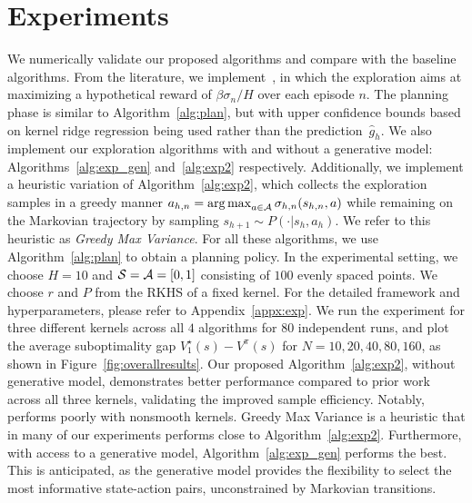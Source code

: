 \section{Experiments}\label{sec:exp}



We numerically validate our proposed algorithms and compare with the baseline algorithms. From the literature, we implement~\cite{qiu2021reward}, in which the exploration aims at maximizing a hypothetical reward of $\beta\sigma_n/H$ over each episode $n$. The planning phase is similar to Algorithm~\ref{alg:plan}, but with upper confidence bounds based on kernel ridge regression being used rather than the prediction~$\hat{g}_h$. 
We also implement our exploration algorithms with and without a generative model: Algorithms~\ref{alg:exp_gen} and~\ref{alg:exp2} respectively. Additionally, we implement a heuristic variation of Algorithm~\ref{alg:exp2}, which collects the exploration samples in a greedy manner $a_{h,n}=\operatorname*{arg\,max}_{a\in\mathcal{A}}\sigma_{h,n}(s_{h,n},a)$ while remaining on the Markovian trajectory by sampling $s_{h+1}\sim P(\cdot|s_h,a_h)$. We refer to this heuristic as \emph{Greedy Max Variance}. For all these  algorithms, we use Algorithm~\ref{alg:plan} to obtain a planning policy. In the experimental setting, we choose $H=10$ and $\mathcal{S}=\mathcal{A}=[0,1]$ consisting of $100$ evenly spaced points. We choose $r$ and $P$ from the RKHS of a fixed kernel. For the detailed framework and hyperparameters, please refer to Appendix~\ref{appx:exp}. We run the experiment for three different kernels across all $4$ algorithms for $80$ independent runs, and plot the average suboptimality gap $V_1^{\star}(s)-V^{\pi}(s)$ for $N=10,20, 40, 80, 160$, as shown in Figure~\ref{fig:overallresults}.
Our proposed Algorithm~\ref{alg:exp2}, without generative model, demonstrates better performance compared to prior work \citep{qiu2021reward} across all three kernels, validating the improved sample efficiency. Notably, \citet{qiu2021reward} performs poorly with nonsmooth kernels. Greedy Max Variance is a heuristic that in many of our experiments performs close to Algorithm~\ref{alg:exp2}.
Furthermore, with access to a generative model, Algorithm~\ref{alg:exp_gen} performs the best. This is anticipated, as the generative model provides the flexibility to select the most informative state-action pairs, unconstrained by Markovian transitions.


